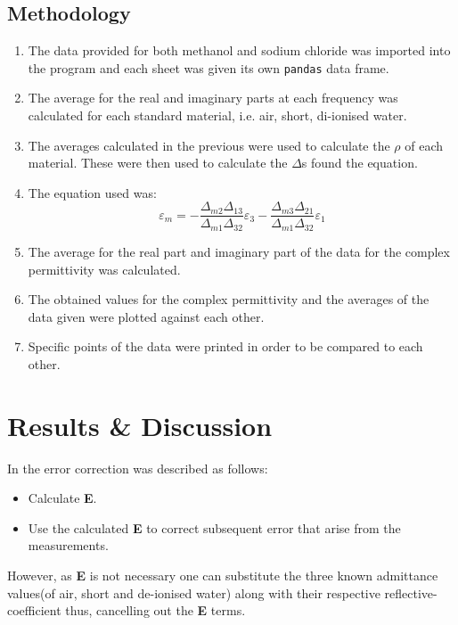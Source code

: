 \documentclass[12pt, a4paper]{article}
\begin{document}
\begin{multicols*}{2}
\subsection{Methodology}
\begin{enumerate}
    \item The data provided for both methanol and sodium chloride was imported into the program and each sheet was given its own \texttt{pandas} data frame.
    \item The average for the real and imaginary parts at each frequency was calculated for each standard material, i.e. air, short, di-ionised water.
    \item The averages calculated in the previous were used to calculate the \(\rho\) of each material. These were then used to calculate the \(\Delta\)s found the equation.
    \item The equation used was:
            \begin{equation}
                \varepsilon_m = -\frac{\Delta_{m2}\Delta_{13}}{\Delta_{m1}\Delta_{32}}\varepsilon_3 - \frac{\Delta_{m3}\Delta_{21}}{\Delta_{m1}\Delta_{32}}\varepsilon_1
            \end{equation}
    \item The average for the real part and imaginary part of the data for the complex permittivity was calculated.
    \item The obtained values for the complex permittivity and the averages of the data given were plotted against each other.
    \item Specific points of the data were printed in order to be compared to each other.
\end{enumerate}

\section{Results \& Discussion}
In \cite{marsland1987dielectric} the error correction was described as follows:
\begin{itemize}
    \item Calculate \textbf{E}.
    \item Use the calculated \textbf{E} to correct subsequent error that arise from the measurements.
\end{itemize}
However, as \textbf{E} is not necessary one can substitute the three known admittance values(of air, short and de-ionised water) along with their respective reflective-coefficient thus, cancelling out the \textbf{E} terms.


\end{multicols*}
\end{document}
